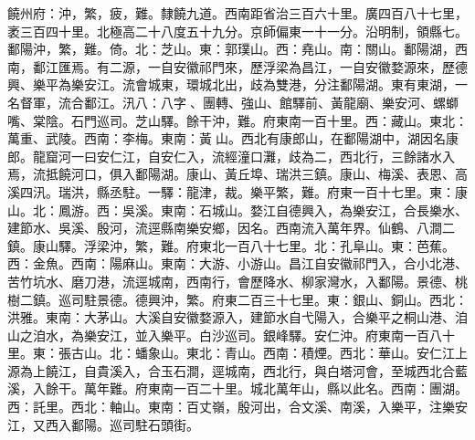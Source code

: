 \begin{pinyinscope}
饒州府：沖，繁，疲，難。隸饒九道。西南距省治三百六十里。廣四百八十七里，袤三百四十里。北極高二十八度五十九分。京師偏東一十一分。沿明制，領縣七。鄱陽沖，繁，難。倚。北：芝山。東：郭璞山。西：堯山。南：關山。鄱陽湖，西南，鄱江匯焉。有二源，一自安徽祁門來，歷浮梁為昌江，一自安徽婺源來，歷德興、樂平為樂安江。流會城東，環城北出，歧為雙港，分注鄱陽湖。東有東湖，一名督軍，流合鄱江。汛八：八字、團轉、強山、館驛前、黃龍廟、樂安河、螺螄嘴、棠陰。石門巡司。芝山驛。餘干沖，難。府東南一百十里。西：藏山。東北：萬重、武陵。西南：李梅。東南：黃山。西北有康郎山，在鄱陽湖中，湖因名康郎。龍窟河一曰安仁江，自安仁入，流經潼口灘，歧為二，西北行，三餘諸水入焉，流抵饒河口，俱入鄱陽湖。康山、黃丘埠、瑞洪三鎮。康山、梅溪、表恩、高溪四汛。瑞洪，縣丞駐。一驛：龍津，裁。樂平繁，難。府東一百十七里。東：康山。北：鳳游。西：吳溪。東南：石城山。婺江自德興入，為樂安江，合長樂水、建節水、吳溪、殷河，流逕縣南樂安鄉，因名。西南流入萬年界。仙鶴、八澗二鎮。康山驛。浮梁沖，繁，難。府東北一百八十七里。北：孔阜山。東：芭蕉。西：金魚。西南：陽麻山。東南：大游、小游山。昌江自安徽祁門入，合小北港、苦竹坑水、磨刀港，流逕城南，西南行，會歷降水、柳家灣水，入鄱陽。景德、桃樹二鎮。巡司駐景德。德興沖，繁。府東二百三十七里。東：銀山、銅山。西北：洪雅。東南：大茅山。大溪自安徽婺源入，建節水自弋陽入，合樂平之桐山港、洎山之洎水，為樂安江，並入樂平。白沙巡司。銀峰驛。安仁沖。府東南一百八十里。東：張古山。北：蟠象山。東北：青山。西南：積煙。西北：華山。安仁江上源為上饒江，自貴溪入，合玉石澗，逕城南，西北行，與白塔河會，至城西北合藍溪，入餘干。萬年難。府東南一百二十里。城北萬年山，縣以此名。西南：團湖。西：託里。西北：軸山。東南：百丈嶺，殷河出，合文溪、南溪，入樂平，注樂安江，又西入鄱陽。巡司駐石頭街。


\end{pinyinscope}
